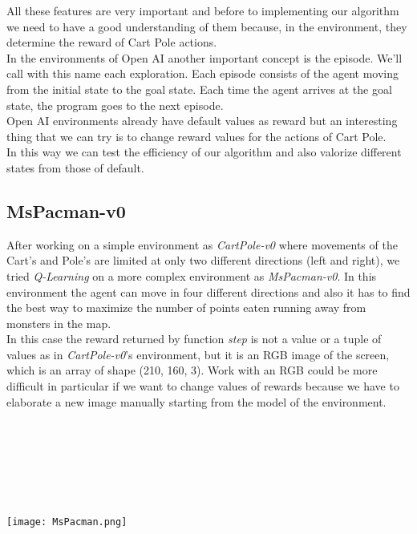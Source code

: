 \documentclass[]{report}
\begin{document}
All these features are very important and before to implementing our algorithm we need to have a good understanding of them because, in the environment, they determine the reward of Cart Pole actions.\\
In the environments of Open AI another important concept is the episode.  We'll call with this name each exploration.  Each episode  consists of the agent moving from the initial state to the goal state.  Each time the agent arrives at the goal state, the program goes to the next episode.\\
Open AI environments already have default values as reward but an interesting thing that we can try is to change reward values for the actions of Cart Pole.\\
In this way we can test the efficiency of our algorithm and also valorize different states from those of default.

\subsection{MsPacman-v0}
After working on a simple environment as \emph{CartPole-v0} where movements of the Cart's and Pole's are limited at only two different directions (left and right), we tried \emph{Q-Learning} on a more complex environment as \emph{MsPacman-v0}.
In this environment the agent can move in four different directions and also it has to find the best way to maximize the number of points eaten running away from monsters in the map.\\
In this case the reward returned by function \emph{step} is not a value or a tuple of values as in \emph{CartPole-v0}'s environment, but it is an RGB image of the screen, which is an array of shape (210, 160, 3).
Work with an RGB could be more difficult in particular if we want to change values of rewards because we have to elaborate a new image manually starting from the model of the environment.\\
\\\\\\\\\\\\
\begin{center}
	\texttt{[image: MsPacman.png]}
\end{center}

\vspace{10 mm}
\end{document}
